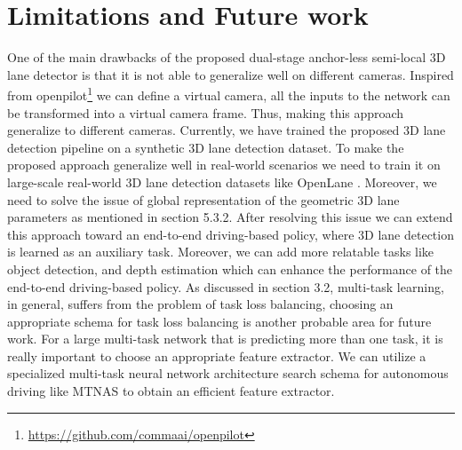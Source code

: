     \section{Limitations and Future work}
    One of the main drawbacks of the proposed dual-stage anchor-less semi-local 3D lane detector is that it is not able to generalize well on different cameras. Inspired from openpilot\footnote{\url{https://github.com/commaai/openpilot}} we can define a virtual camera, all the inputs to the network can be transformed into a virtual camera frame. Thus, making this approach generalize to different cameras. Currently, we have trained the proposed 3D lane detection pipeline on a synthetic 3D lane detection dataset. To make the proposed approach generalize well in real-world scenarios we need to train it on large-scale real-world 3D lane detection datasets like OpenLane \cite{chen2022persformer}. Moreover, we need to solve the issue of global representation of the geometric 3D lane parameters as mentioned in section 5.3.2. After resolving this issue we can extend this approach toward an end-to-end driving-based policy, where 3D lane detection is learned as an auxiliary task.
    Moreover, we can add more relatable tasks like object detection, and depth estimation which can enhance the performance of the end-to-end driving-based policy. As discussed in section 3.2, multi-task learning, in general, suffers from the problem of task loss balancing, choosing an appropriate schema for task loss balancing is another probable area for future work. For a large multi-task network that is predicting more than one task, it is really important to choose an appropriate feature extractor. We can utilize a specialized multi-task neural network architecture search schema for autonomous driving like MTNAS \cite{10.1007/978-3-030-69535-4_41} to obtain an efficient feature extractor.     

